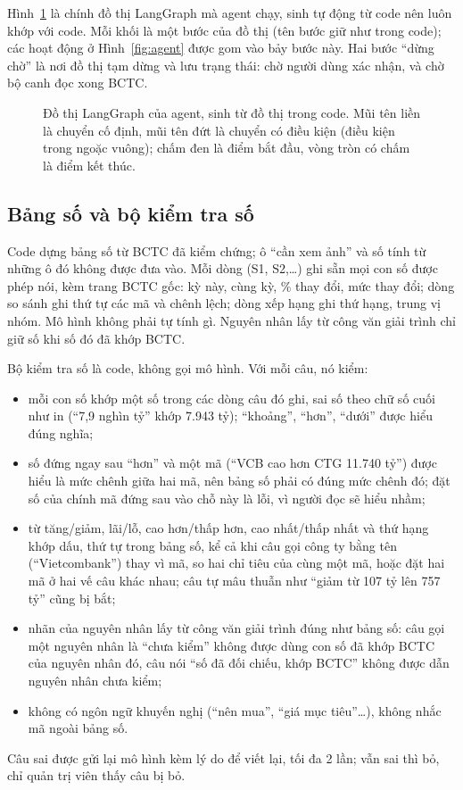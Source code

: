 \documentclass[12pt,a4paper]{report}
\newcommand{\enquote}[1]{“#1”}
\begin{document}
Hình~\ref{fig:agent-graph} là chính đồ thị LangGraph mà agent chạy, sinh tự động từ code nên luôn khớp với code. Mỗi khối
là một bước của đồ thị (tên bước giữ như trong code); các hoạt động ở Hình~\ref{fig:agent} được gom vào bảy bước này.
Hai bước \enquote{dừng chờ} là nơi đồ thị tạm dừng và lưu trạng thái: chờ người dùng xác nhận, và chờ bộ canh đọc xong
BCTC.

\begin{figure}[tbp]
\centering
\resizebox{\linewidth}{!}{}
\caption{Đồ thị LangGraph của agent, sinh từ đồ thị trong code. Mũi tên liền là chuyển cố định, mũi tên đứt là chuyển
có điều kiện (điều kiện trong ngoặc vuông); chấm đen là điểm bắt đầu, vòng tròn có chấm là điểm kết thúc.}\label{fig:agent-graph}
\end{figure}

\subsection{Bảng số và bộ kiểm tra số}
Code dựng bảng số từ BCTC đã kiểm chứng; ô \enquote{cần xem ảnh} và số tính từ những ô đó không được đưa vào. Mỗi dòng
(S1, S2,\ldots) ghi sẵn mọi con số được phép nói, kèm trang BCTC gốc: kỳ này, cùng kỳ, \% thay đổi, mức thay đổi; dòng
so sánh ghi thứ tự các mã và chênh lệch; dòng xếp hạng ghi thứ hạng, trung vị nhóm. Mô hình không phải tự tính gì.
Nguyên nhân lấy từ công văn giải trình chỉ giữ số khi số đó đã khớp BCTC.

Bộ kiểm tra số là code, không gọi mô hình. Với mỗi câu, nó kiểm:
\begin{itemize}
  \item mỗi con số khớp một số trong các dòng câu đó ghi, sai số theo chữ số cuối như in (\enquote{7,9 nghìn tỷ} khớp
        7.943 tỷ); \enquote{khoảng}, \enquote{hơn}, \enquote{dưới} được hiểu đúng nghĩa;
  \item số đứng ngay sau \enquote{hơn} và một mã (\enquote{VCB cao hơn CTG 11.740 tỷ}) được hiểu là mức chênh giữa hai
        mã, nên bảng số phải có đúng mức chênh đó; đặt số của chính mã đứng sau vào chỗ này là lỗi, vì người đọc sẽ
        hiểu nhầm;
  \item từ tăng/giảm, lãi/lỗ, cao hơn/thấp hơn, cao nhất/thấp nhất và thứ hạng khớp dấu, thứ tự trong bảng số, kể cả
        khi câu gọi công ty bằng tên (\enquote{Vietcombank}) thay vì mã, so hai chỉ tiêu của cùng một mã, hoặc đặt hai
        mã ở hai vế câu khác nhau; câu tự mâu thuẫn như \enquote{giảm từ 107 tỷ lên 757 tỷ} cũng bị bắt;
  \item nhãn của nguyên nhân lấy từ công văn giải trình đúng như bảng số: câu gọi một nguyên nhân là \enquote{chưa kiểm}
        không được dùng con số đã khớp BCTC của nguyên nhân đó, câu nói \enquote{số đã đối chiếu, khớp BCTC} không được dẫn
        nguyên nhân chưa kiểm;
  \item không có ngôn ngữ khuyến nghị (\enquote{nên mua}, \enquote{giá mục tiêu}\ldots), không nhắc mã ngoài bảng số.
\end{itemize}
Câu sai được gửi lại mô hình kèm lý do để viết lại, tối đa 2 lần; vẫn sai thì bỏ, chỉ quản trị viên thấy câu bị bỏ.
\end{document}
